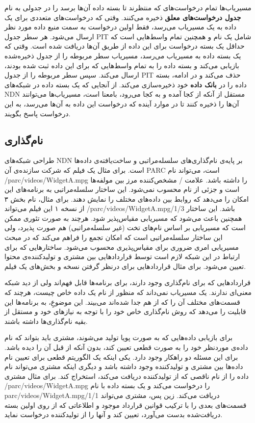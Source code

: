 مسیریاب‌ها تمام درخواست‌‌های که منتظرند تا بسته داده آن‌ها برسد را در جدولی به نام \textbf{جدول درخواست‌‌های معلق} ذخیره‌ می‌کنند. وقتی که درخواست‌‌‌های متعددی برای یک داده به یک مسیریاب می‌رسد، فقط اولین درخواست به سمت منبع داده مورد نظر ارسال می‌شود. هر سطر جدول PIT شامل یک نام و همچنین تمام واسط‌‌هایی است که حداقل یک بسته درخواست برای این داده از طریق آن‌ها دریافت شده است. وقتی که یک بسته داده به مسیریاب می‌رسد، مسیریاب سطر مربوطه را از جدول ذخیره‌شده بازیابی می‌کند و بسته داده را به تمام واسط‌هایی که برای این داده ثبت شده بودند، ارسال می‌کند. سپس سطر مربوطه را از جدول PIT  حذف می‌کند و در ادامه، بسته داده را در \textbf{بانک داده} خود ذخیره‌سازی می‌کند. از آنجایی که یک بسته داده در شبکه‌های NDN مستقل از آنکه از کجا آمده و به کجا می‌رود، بامعنا است، مسیریاب‌ها می‌توانند آن‌ها را ذخیره کنند تا در موارد آینده که درخواست این داده به آن‌ها می‌رسد، به این درخواست پاسخ بگویند. 

\subsection{نام‌گذاری}
طراحی شبکه‌های NDN بر پایه‌ی نام‌گذاری‌های سلسله‌مراتبی و ساخت‌یافته‌ی داده‌ها است. برای مثال یک فیلم که شرکت سازنده‌ی آن PARC است، می‌تواند نام /parc/videos/WidgetA.mpg را داشته باشد. علامت / مشخص‌کننده مرز بین مولفه‌ها است و جزئی از نام محسوب نمی‌شود. این ساختار سلسله‌مراتبی به برنامه‌های این امکان را می‌دهد که روابط بین داده‌های مختلف را نمایش دهند. برای مثال، نام بخش ۳ از نسخه ۱ این فیلم می‌تواند /parc/videos/WidgetA.mpg/1/3 باشد. این ساختار همچنین باعث می‌شود که مسیریابی مقیاس‌پذیر شود. هرچند به صورت تئوری ممکن است که مسیریابی بر اساس نام‌های تخت (غیر سلسله‌مراتبی) هم صورت پذیرد،
\cite{rofl}
 ولی این ساختار سلسله‌مراتبی است که امکان تجمع را فراهم می‌کند که در مبحث مسیریابی امری ضروری برای مقیاس‌پذیری محسوب می‌شود. ساختارهایی که برای ارتباط در این شبکه لازم است توسط قرارداد‌هایی بین مشتری و تولیدکننده‌ی محتوا تعیین می‌شود. برای مثال قراردادهایی برای درنظر گرفتن نسخه و بخش‌های یک فیلم.
 
قراردادهایی که برای نام‌گذاری وجود دارند، برای برنامه‌ها قابل فهم‌اند ولی از دید شبکه معنی‌ای ندارند. یک مسیریاب نمی‌داند که منظور از نام یک داده خاص چیست، هرچند که قسمت‌های مختلف آن را که از هم جدا شده‌اند می‌بیند. این موضوعِ، به برنامه‌ها این قابلیت را می‌دهد که روش نام‌گذاری خاص خود را با توجه به نیاز‌های خود و مستقل از بقیه نام‌گذاری‌ها داشته باشند. 

برای بازیابی داده‌هایی که به صورت پویا تولید می‌شوند، مشتری باید بتواند که نام داده‌ی موردنظر خود را به صورت قطعی تعیین کند، بدون آنکه از قبل آن را دیده باشد. برای این مسئله دو راهکار وجود دارد. یکی اینکه یک الگوریتم قطعی برای تعیین نام داده‌ها بین مشتری و تولیدکننده وجود داشته باشد  و دیگری اینکه مشتری می‌تواند نام داده را از نام ناقصی که از تولیدکننده دریافت‌ می‌کند، استخراج کند. برای مثال مشتری /parc/videos/WidgetA.mpg را درخواست می‌کند و یک بسته داده با نام  parc/videos/WidgetA.mpg/1/1 دریافت می‌کند. زین پس، مشتری می‌تواند قسمت‌های بعدی را با ترکیب قوانین قرارداد موجود و اطلاعاتی که از روی اولین بسته دریافت‌شده بدست می‌آورد، تعیین کند و آنها را از تولیدکننده درخواست نماید. 

